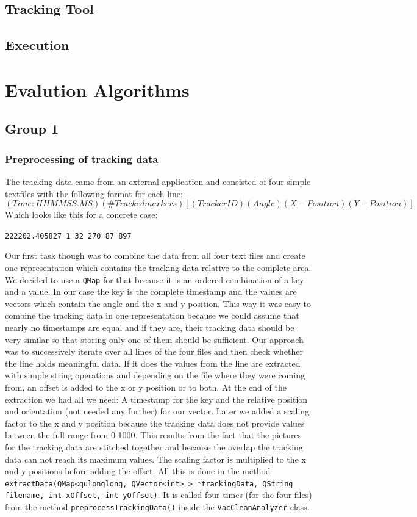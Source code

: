 \documentclass[twoside]{article}
\begin{document}
\subsection{Tracking Tool} %
\subsection{Execution} %

\section{Evalution Algorithms}
\subsection{Group 1}
\subsubsection{Preprocessing of tracking data} %
The tracking data came from an external application and consisted of four simple textfiles with the following format for each line:
\[(Time:HHMMSS.MS) (\#Tracked markers) [(Tracker ID) (Angle) (X-Position) (Y-Position)] \]
Which looks like this for a concrete case:
\begin{center}
\texttt{222202.405827\ 1\ 32\ 270\ 87\ 897}
\end{center}
Our first task though was to combine the data from all four text files and create one representation which contains the tracking data relative to the complete area. 
We decided to use a \texttt{QMap} for that because it is an ordered combination of a key and a value. In our case the key is the complete timestamp and the values are vectors which contain the angle and the x and y position. This way it was easy to combine the tracking data in one representation because we could assume that nearly no timestamps are equal and if they are, their tracking data should be very similar so that storing only one of them should be sufficient.
Our approach was to successively iterate over all lines of the four files and then check whether the line holds meaningful data. If it does the values from the line are extracted with simple string operations and depending on the file where they were coming from, an offset is added to the x or y position or to both. At the end of the extraction we had all we need: A timestamp for the key and the relative position and orientation (not needed any further) for our vector.
Later we added a scaling factor to the x and y position because the tracking data does not provide values between the full range from 0-1000. This results from the fact that the pictures for the tracking data are stitched together and because the overlap the tracking data can not reach its maximum values. The scaling factor is multiplied to the x and y positions before adding the offset.
All this is done in the method \texttt{extractData(QMap<qulonglong, QVector<int> > *trackingData, QString filename, int xOffset, int yOffset)}. It is called four times (for the four files) from the method \texttt{preprocessTrackingData()} inside the \texttt{VacCleanAnalyzer} class.
\end{document}
